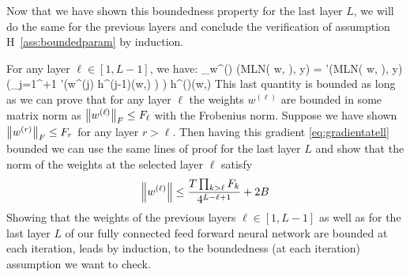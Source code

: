 \documentclass[11pt]{article}
\theoremstyle{k}
\begin{document}
Now that we have shown this boundedness property for the last layer $L$, we will do the same for the previous layers and conclude the verification of assumption H~\ref{ass:boundedparam} by induction.

For any layer $\ell \in [1, L-1]$, we have:
\beq\label{eq:gradientatell}
\nabla_{w^{(\ell)}}  (\textsf{MLN}( w, \xi), y)  =  '(\textsf{MLN}( w, \xi), y) \left(\prod_{j=1}^{\ell+1} \sigma'\left(w^{(j)} h^{(j-1)}(w,\xi) \right) \right) h^{()}(w,\xi) 
\eeq
This last quantity is bounded as long as we can prove that for any layer $\ell$ the weights $w^{(\ell)}$ are bounded in some matrix norm as $\left\Vert w^{(\ell)} \right\Vert_{F} \leq F_\ell$ with the Frobenius norm.
Suppose we have shown $\left\Vert w^{(r)} \right\Vert_{F} \leq F_r$ for any layer $r > \ell$. 
Then having this gradient \eqref{eq:gradientatell} bounded we can use the same lines of proof for the last layer $L$ and show that the norm of the weights at the selected layer $\ell$ satisfy
$$
\left\Vert w^{(\ell)} \right\Vert \leq \frac{T \prod_{k > \ell} F_k}{4^{L-\ell+1}} + 2B
$$
Showing that the weights of the previous layers $\ell \in [1, L-1]$ as well as for the last layer $L$ of our fully connected feed forward neural network are bounded at each iteration, leads by induction, to the boundedness (at each iteration) assumption we want to check.

\newpage






\end{document}
